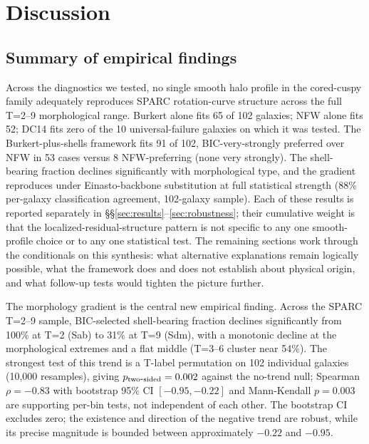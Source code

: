\section{Discussion}
\label{sec:discussion}

\subsection{Summary of empirical findings}

Across the diagnostics we tested, no single smooth halo profile in the cored-cuspy family adequately reproduces SPARC rotation-curve structure across the full T=2--9 morphological range. Burkert alone fits 65 of 102 galaxies; NFW alone fits 52; DC14 fits zero of the 10 universal-failure galaxies on which it was tested. The Burkert-plus-shells framework fits 91 of 102, BIC-very-strongly preferred over NFW in 53 cases versus 8 NFW-preferring (none very strongly). The shell-bearing fraction declines significantly with morphological type, and the gradient reproduces under Einasto-backbone substitution at full statistical strength (88\% per-galaxy classification agreement, 102-galaxy sample). Each of these results is reported separately in \S\S\ref{sec:results}--\ref{sec:robustness}; their cumulative weight is that the localized-residual-structure pattern is not specific to any one smooth-profile choice or to any one statistical test. The remaining sections work through the conditionals on this synthesis: what alternative explanations remain logically possible, what the framework does and does not establish about physical origin, and what follow-up tests would tighten the picture further.

The morphology gradient is the central new empirical finding. Across the SPARC T=2--9 sample, BIC-selected shell-bearing fraction declines significantly from 100\% at T=2 (Sab) to 31\% at T=9 (Sdm), with a monotonic decline at the morphological extremes and a flat middle (T=3--6 cluster near 54\%). The strongest test of this trend is a T-label permutation on 102 individual galaxies (10{,}000 resamples), giving $p_{\rm two\mbox{-}sided} = 0.002$ against the no-trend null; Spearman $\rho = -0.83$ with bootstrap 95\% CI $[-0.95, -0.22]$ and Mann-Kendall $p = 0.003$ are supporting per-bin tests, not independent of each other. The bootstrap CI excludes zero; the existence and direction of the negative trend are robust, while its precise magnitude is bounded between approximately $-0.22$ and $-0.95$.

